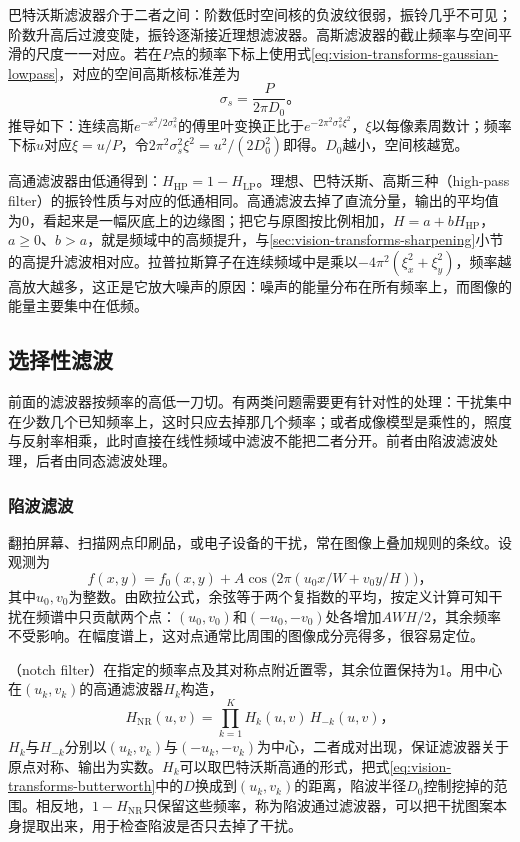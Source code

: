 巴特沃斯滤波器介于二者之间：阶数低时空间核的负波纹很弱，振铃几乎不可见；阶数升高后过渡变陡，振铃逐渐接近理想滤波器。高斯滤波器的截止频率与空间平滑的尺度一一对应。若在$P$点的频率下标上使用式\eqref{eq:vision-transforms-gaussian-lowpass}，对应的空间高斯核标准差为
\begin{equation}
  \sigma_s=\frac{P}{2\pi D_0}\text{。}
  \label{eq:vision-transforms-gaussian-scale}
\end{equation}
推导如下：连续高斯$e^{-x^2/2\sigma_s^2}$的傅里叶变换正比于$e^{-2\pi^2\sigma_s^2\xi^2}$，$\xi$以每像素周数计；频率下标$u$对应$\xi=u/P$，令$2\pi^2\sigma_s^2\xi^2=u^2/(2D_0^2)$即得。$D_0$越小，空间核越宽。

高通滤波器由低通得到：$H_{\mathrm{HP}}=1-H_{\mathrm{LP}}$。理想、巴特沃斯、高斯三种（high-pass filter）的振铃性质与对应的低通相同。高通滤波去掉了直流分量，输出的平均值为0，看起来是一幅灰底上的边缘图；把它与原图按比例相加，$H=a+bH_{\mathrm{HP}}$，$a\geq0$、$b>a$，就是频域中的高频提升，与\ref{sec:vision-transforms-sharpening}小节的高提升滤波相对应。拉普拉斯算子在连续频域中是乘以$-4\pi^2(\xi_x^2+\xi_y^2)$，频率越高放大越多，这正是它放大噪声的原因：噪声的能量分布在所有频率上，而图像的能量主要集中在低频。

\subsection{选择性滤波}
\label{sec:vision-transforms-selective-filtering}

前面的滤波器按频率的高低一刀切。有两类问题需要更有针对性的处理：干扰集中在少数几个已知频率上，这时只应去掉那几个频率；或者成像模型是乘性的，照度与反射率相乘，此时直接在线性频域中滤波不能把二者分开。前者由陷波滤波处理，后者由同态滤波处理。

\subsubsection{陷波滤波}

翻拍屏幕、扫描网点印刷品，或电子设备的干扰，常在图像上叠加规则的条纹。设观测为
\[
  f(x,y)=f_0(x,y)+A\cos\bigl(2\pi(u_0x/W+v_0y/H)\bigr)\text{，}
\]
其中$u_0,v_0$为整数。由欧拉公式，余弦等于两个复指数的平均，按定义计算可知干扰在频谱中只贡献两个点：$(u_0,v_0)$和$(-u_0,-v_0)$处各增加$AWH/2$，其余频率不受影响。在幅度谱上，这对点通常比周围的图像成分亮得多，很容易定位。

（notch filter）在指定的频率点及其对称点附近置零，其余位置保持为1。用中心在$(u_k,v_k)$的高通滤波器$H_k$构造，
\begin{equation}
  H_{\mathrm{NR}}(u,v)=\prod_{k=1}^{K}H_k(u,v)\,H_{-k}(u,v)\text{，}
  \label{eq:vision-transforms-notch}
\end{equation}
$H_k$与$H_{-k}$分别以$(u_k,v_k)$与$(-u_k,-v_k)$为中心，二者成对出现，保证滤波器关于原点对称、输出为实数。$H_k$可以取巴特沃斯高通的形式，把式\eqref{eq:vision-transforms-butterworth}中的$D$换成到$(u_k,v_k)$的距离，陷波半径$D_0$控制挖掉的范围。相反地，$1-H_{\mathrm{NR}}$只保留这些频率，称为陷波通过滤波器，可以把干扰图案本身提取出来，用于检查陷波是否只去掉了干扰。

